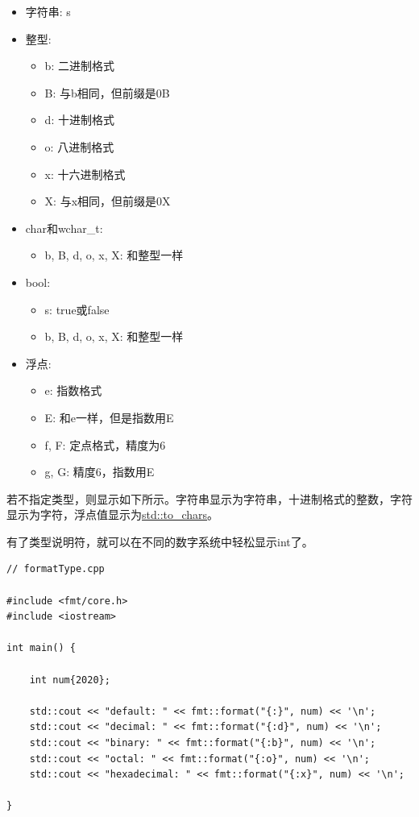 \begin{itemize}
\item 
字符串: s

\item 
整型:
\begin{itemize}
\item 
b: 二进制格式

\item 
B: 与b相同，但前缀是0B

\item 
d: 十进制格式

\item 
o: 八进制格式

\item 
x: 十六进制格式

\item 
X: 与x相同，但前缀是0X
\end{itemize}

\item 
char和wchar\_t:
\begin{itemize}
\item 
b, B, d, o, x, X: 和整型一样
\end{itemize}

\item 
bool:
\begin{itemize}
\item 
s: true或false

\item 
b, B, d, o, x, X: 和整型一样
\end{itemize}

\item 
浮点:
\begin{itemize}
\item 
e: 指数格式

\item 
E: 和e一样，但是指数用E

\item 
f, F: 定点格式，精度为6

\item 
g, G: 精度6，指数用E
\end{itemize}
\end{itemize}

若不指定类型，则显示如下所示。字符串显示为字符串，十进制格式的整数，字符显示为字符，浮点值显示为\href{https://en.cppreference.com/w/cpp/utility/to_chars}{std::to\_chars}。

有了类型说明符，就可以在不同的数字系统中轻松显示int了。

\begin{lstlisting}[style=styleCXX]
// formatType.cpp

#include <fmt/core.h>
#include <iostream>

int main() {

	int num{2020};
	
	std::cout << "default: " << fmt::format("{:}", num) << '\n';
	std::cout << "decimal: " << fmt::format("{:d}", num) << '\n';
	std::cout << "binary: " << fmt::format("{:b}", num) << '\n';
	std::cout << "octal: " << fmt::format("{:o}", num) << '\n';
	std::cout << "hexadecimal: " << fmt::format("{:x}", num) << '\n';

}
\end{lstlisting}

